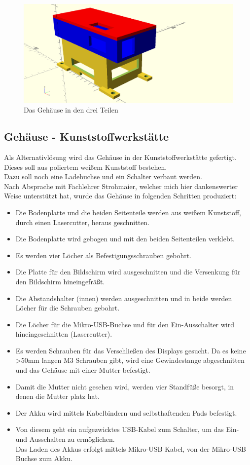 \documentclass[12pt,a4paper]{article}
\begin{document}
{\begin{figure}[H]
  \centering
		\includegraphics[scale=0.6, angle=90]{graphics/gehaeuse.png}
		\caption{Das Gehäuse in den drei Teilen}
		\label{fig:case-3D}
\end{figure}

\newpage
\subsection{Gehäuse - Kunststoffwerkstätte}

Als Alternativlösung wird das Gehäuse in der Kunststoffwerkstätte gefertigt. Dieses soll aus poliertem weißem Kunststoff bestehen. \\
Dazu soll noch eine Ladebuchse und ein Schalter verbaut werden. \\
Nach Absprache mit Fachlehrer Strohmaier, welcher mich hier dankenswerter Weise unterstützt hat, wurde das Gehäuse in folgenden Schritten produziert:
\begin{itemize}
	\item{Die Bodenplatte und die beiden Seitenteile werden aus weißem Kunststoff, durch einen Lasercutter, heraus geschnitten.}
	\item{Die Bodenplatte wird gebogen und mit den beiden Seitenteilen verklebt.}
	\item{Es werden vier Löcher als Befestigungsschrauben gebohrt.}
	\item{Die Platte für den Bildschirm wird ausgeschnitten und die Versenkung für den Bildschirm hineingefräßt.}
	\item{Die Abstandshalter (innen) werden ausgeschnitten und in beide werden Löcher für die Schrauben gebohrt.}
	\item{Die Löcher für die Mikro-USB-Buchse und für den Ein-Ausschalter wird hineingeschnitten (Lasercutter).}
	\item{Es werden Schrauben für das Verschließen des Displays gesucht. Da es keine >50mm langen M3 Schrauben gibt, wird eine Gewindestange abgeschnitten und das Gehäuse mit einer Mutter befestigt.}
	\item{Damit die Mutter nicht gesehen wird, werden vier Standfüße besorgt, in denen die Mutter platz hat.}
	\item{Der Akku wird mittels Kabelbindern und selbsthaftenden Pads befestigt.}
	\item{Von diesem geht ein aufgezwicktes USB-Kabel zum Schalter, um das Ein- und Ausschalten zu ermöglichen. \\
Das Laden des Akkus erfolgt mittels Mikro-USB Kabel, von der Mikro-USB Buchse zum Akku.}
\end{itemize}
 
}
\end{document}
